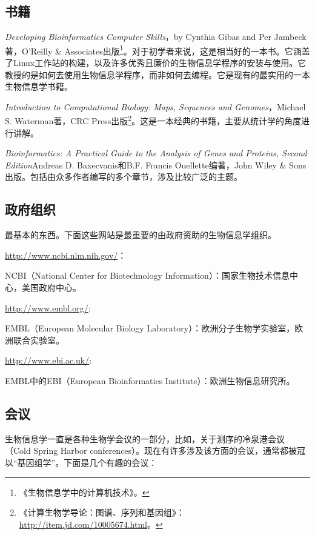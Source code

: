 \subsection{书籍}
\textit{Developing Bioinformatics Computer Skills}，by Cynthia Gibas and Per Jambeck著，O'Reilly \& Associates出版\footnote{《生物信息学中的计算机技术》。}。对于初学者来说，这是相当好的一本书。它涵盖了Linux工作站的构建，以及许多优秀且廉价的生物信息学程序的安装与使用。它教授的是如何去使用生物信息学程序，而非如何去编程。它是现有的最实用的一本生物信息学书籍。

\textit{Introduction to Computational Biology: Maps, Sequences and Genomes}，Michael S. Waterman著，CRC Press出版\footnote{《计算生物学导论：图谱、序列和基因组》：\href{http://item.jd.com/10005674.html}{http://item.jd.com/10005674.html}。}。这是一本经典的书籍，主要从统计学的角度进行讲解。

\textit{Bioinformatics: A Practical Guide to the Analysis of Genes and Proteins, Second Edition}Andreas D. Baxecvanis和B.F. Francis Ouellette编著，John Wiley \& Sons出版。包括由众多作者编写的多个章节，涉及比较广泛的主题。

\subsection{政府组织}
最基本的东西。下面这些网站是最重要的由政府资助的生物信息学组织。

\href{http://www.ncbi.nlm.nih.gov/}{http://www.ncbi.nlm.nih.gov/}：

\begin{adjustwidth}{4em}{}
NCBI（National Center for Biotechnology Information）：国家生物技术信息中心，美国政府中心。
\end{adjustwidth}

\href{http://www.embl.org/}{http://www.embl.org/}:

\begin{adjustwidth}{4em}{}
EMBL（European Molecular Biology Laboratory）：欧洲分子生物学实验室，欧洲联合实验室。
\end{adjustwidth}

\href{http://www.ebi.ac.uk/}{http://www.ebi.ac.uk/}:

\begin{adjustwidth}{4em}{}
EMBL中的EBI（European Bioinformatics Institute）：欧洲生物信息研究所。
\end{adjustwidth}

\subsection{会议}
生物信息学一直是各种生物学会议的一部分，比如，关于测序的冷泉港会议（Cold Spring Harbor conferences）。现在有许多涉及该方面的会议，通常都被冠以“基因组学”。下面是几个有趣的会议：

